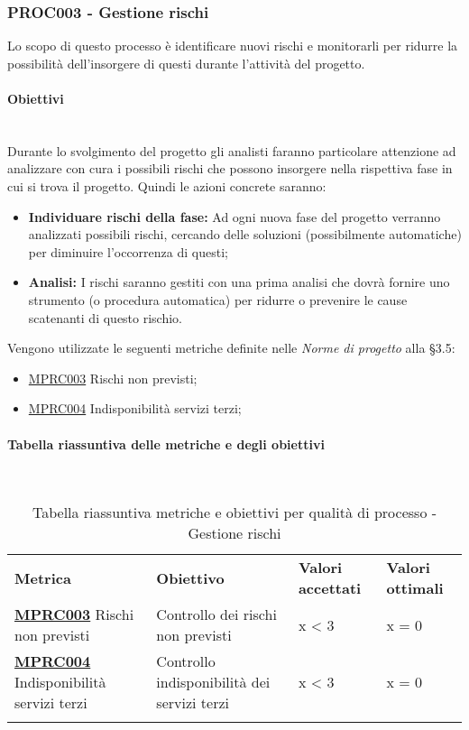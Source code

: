 \subsubsection{PROC003 - Gestione rischi}
\label{sec:gestione_rischi}
Lo scopo di questo processo è identificare nuovi rischi e monitorarli per ridurre la possibilità dell'insorgere di questi durante l'attività del progetto.
\paragraph{Obiettivi}\mbox{}\\[0.4cm]
Durante lo svolgimento del progetto gli analisti faranno particolare attenzione ad analizzare con cura i possibili rischi che possono insorgere nella rispettiva fase in cui si trova il progetto. 
Quindi le azioni concrete saranno:
\begin{itemize}
	\item \textbf{Individuare rischi della fase:} Ad ogni nuova fase del progetto verranno analizzati possibili rischi, cercando delle soluzioni (possibilmente automatiche) per diminuire l’occorrenza di questi;
	\item \textbf{Analisi:} I rischi saranno gestiti con una prima analisi che dovrà fornire uno strumento (o procedura automatica) per ridurre o prevenire le cause scatenanti di questo rischio.
\end{itemize}
Vengono utilizzate le seguenti metriche definite nelle \textit{Norme di progetto} alla §3.5:
\begin{itemize}
	\item \label{metrica_processo_MPRC003}\hyperref[metrica_processo_ob_MPRC003]{MPRC003} Rischi non previsti;
	\item \label{metrica_processo_MPRC004}\hyperref[metrica_processo_ob_MPRC004]{MPRC004} Indisponibilità servizi terzi;
\end{itemize}
\clearpage
\paragraph{Tabella riassuntiva delle metriche e degli obiettivi}\mbox{}\\[0.3cm]
\begin{center}
\renewcommand{\arraystretch}{1.5}
	\begin{longtable}{  >{\RaggedRight}p{2.8cm}  >{\RaggedRight}p{5cm} >{\RaggedRight}p{2.5cm}  >{\RaggedRight}p{2.5cm}  }
		\rowcolor{tableHeadYellow}
		\textbf{Metrica}   & \textbf{Obiettivo} & \textbf{Valori \mbox{accettati}} & \textbf{Valori \mbox{ottimali}}\\
		\textbf{\label{metrica_processo_ob_MPRC003}\hyperref[metrica_processo_MPRC003]{MPRC003}} Rischi non previsti & Controllo dei rischi non previsti &  x < 3 &  x = 0  \\
		\textbf{\label{metrica_processo_ob_MPRC004}\hyperref[metrica_processo_MPRC004]{MPRC004}} \mbox{Indisponibilità} servizi terzi & Controllo indisponibilità dei servizi terzi & x < 3 & x = 0 \\
		\rowcolor{white}
		\caption{Tabella riassuntiva metriche e obiettivi per qualità di processo - Gestione rischi}
	\end{longtable}
\end{center}